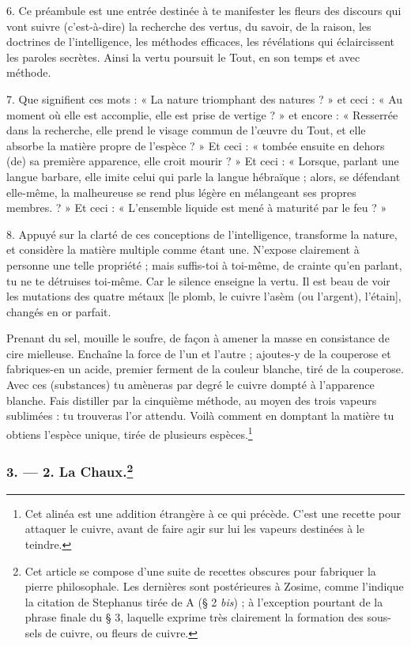 \documentclass[a4paper, 11pt, oneside, polutonikogreek, french]{article}
\begin{document}
6. Ce préambule est une entrée destinée à te manifester les fleurs des discours qui vont suivre (c'est-à-dire) la recherche des vertus, du savoir, de la raison, les doctrines de l'intelligence, les méthodes efficaces, les révélations qui éclaircissent les paroles secrètes. Ainsi la vertu poursuit le Tout, en son temps et avec méthode.

7. Que signifient ces mots : « La nature triomphant des natures ? » et ceci : « Au moment où elle est accomplie, elle est prise de vertige ? » et encore : « Resserrée dans la recherche, elle prend le visage commun de l'œuvre du Tout, et elle absorbe la matière propre de l'espèce ? » Et ceci : « tombée ensuite en dehors (de) sa première apparence, elle croit mourir ? » Et ceci : « Lorsque, parlant une langue barbare, elle imite celui qui parle la langue hébraïque ; alors, se défendant elle-même, la malheureuse se rend plus légère en mélangeant ses propres membres. ? » Et ceci : « L'ensemble liquide est mené à maturité par le feu ? »

8. Appuyé sur la clarté de ces conceptions de l'intelligence, transforme la nature, et considère la matière multiple comme étant une. N'expose clairement à personne une telle propriété ; mais suffis-toi à toi-même, de crainte qu'en parlant, tu ne te détruises toi-même. Car le silence enseigne la vertu. Il est beau de voir les mutations des quatre métaux [le plomb, le cuivre l'asèm (ou l'argent), l'étain], changés en or parfait.

Prenant du sel, mouille le soufre, de façon à amener la masse en consistance de cire mielleuse. Enchaîne la force de l'un et l'autre ; ajoutes-y de la couperose et fabriques-en un acide, premier ferment de la couleur blanche, tiré de la couperose. Avec ces (substances) tu amèneras par degré le cuivre dompté à l'apparence blanche. Fais distiller par la cinquième méthode, au moyen des trois vapeurs sublimées : tu trouveras l'or attendu. Voilà comment en domptant la matière tu obtiens l'espèce unique, tirée de plusieurs espèces.\footnote{Cet alinéa est une addition étrangère à ce qui précède. C'est une recette pour attaquer le cuivre, avant de faire agir sur lui les vapeurs destinées à le teindre.}

\bigskip
\centerline{\EightStarTaper}
\centerline{\EightStarTaper\EightStarTaper}
\bigskip

\subsubsection[3. --- 2. La Chaux.]{3. --- 2. La Chaux.\footnote{Cet article se compose d'une suite de recettes obscures pour fabriquer la pierre philosophale. Les dernières sont postérieures à Zosime, comme l'indique la citation de Stephanus tirée de A (§ 2 \emph{bis}) ; à l'exception pourtant de la phrase finale du § 3, laquelle exprime très clairement la formation des sous-sels de cuivre, ou fleurs de cuivre.}}
\end{document}
